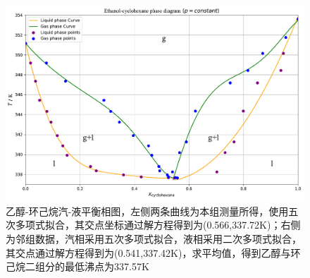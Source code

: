 \documentclass[UTF8,AutoFakeBold,a4paper]{article}
\begin{document}
\begin{figure}[h]
	\centering
	\includegraphics[scale=0.5]{相图}
	\caption{乙醇-环己烷汽-液平衡相图，左侧两条曲线为本组测量所得，使用五次多项式拟合，其交点坐标通过解方程得到为\textcolor[rgb]{0.54,0.13,0.33}{(0.566,337.72K)}；右侧为邻组数据，汽相采用五次多项式拟合，液相采用二次多项式拟合，其交点通过解方程得到为\textcolor[rgb]{0.54,0.13,0.33}{(0.541,337.42K)}，求平均值，得到乙醇与环己烷二组分的最低沸点为\textcolor[rgb]{0.54,0.13,0.33}{337.57K}}
	\label{fi5}
\end{figure}
\end{document}
